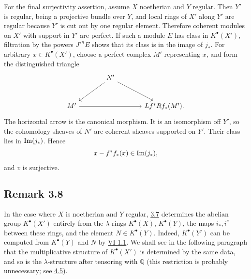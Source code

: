 For the final surjectivity assertion, assume \(X\) noetherian and \(Y\) regular. Then \(Y'\) is regular, being a projective bundle over \(Y\), and local rings of \(X'\) along \(Y'\) are regular because \(Y'\) is cut out by one regular element. Therefore coherent modules on \(X'\) with support in \(Y'\) are perfect. If such a module \(E\) has class in \(K^\bullet(X')\), filtration by the powers \(J'^nE\) shows that its class is in the image of \(j_*\). For arbitrary \(x\in K^\bullet(X')\), choose a perfect complex \(M'\) representing \(x\), and form the distinguished triangle
\[
\begin{tikzcd}[column sep=large,row sep=large]
& N' \arrow[dl] \arrow[dr] &\\
M' \arrow[rr] && Lf^*Rf_*(M').
\end{tikzcd}
\]
The horizontal arrow is the canonical morphism. It is an isomorphism off \(Y'\), so the cohomology sheaves of \(N'\) are coherent sheaves supported on \(Y'\). Their class lies in \(\Imf(j_*)\). Hence
\[
x-f^*f_*(x)\in\Imf(j_*),
\]
and \(v\) is surjective.



\providecommand{\Q}{\mathbb Q}
\providecommand{\bfP}{\mathbf P}
\providecommand{\gr}{\operatorname{gr}}
\providecommand{\Id}{\operatorname{Id}}
\providecommand{\Fil}{\operatorname{Fil}}
\providecommand{\Imf}{\operatorname{Im}}
\providecommand{\rank}{\operatorname{rank}}
\providecommand{\codim}{\operatorname{codim}}
\providecommand{\cJ}{\mathcal J}
\providecommand{\cI}{\mathcal I}
\providecommand{\cN}{\mathcal N}
\providecommand{\cE}{\mathcal E}
\providecommand{\cO}{\mathcal O}


\subsection*{Remark 3.8}

In the case where \(X\) is noetherian and \(Y\) regular, \hyperlink{sga6.e07.thm.3-7}{3.7} determines the abelian group \(K^\bullet(X')\) entirely from the \(\lambda\)-rings \(K^\bullet(X)\), \(K^\bullet(Y)\), the maps \(i_*,i^*\) between these rings, and the element \(N\in K^\bullet(Y)\). Indeed, \(K^\bullet(Y')\) can be computed from \(K^\bullet(Y)\) and \(N\) by \hyperlink{sga6.e06.thm.1-1}{VI 1.1}. We shall see in the following paragraph that the multiplicative structure of \(K^\bullet(X')\) is determined by the same data, and so is the \(\lambda\)-structure after tensoring with \(\mathbb Q\) (this restriction is probably unnecessary; see \hyperlink{sga6.e07.rem.4-5}{4.5}).

